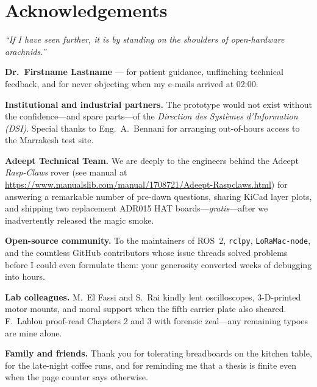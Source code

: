 \chapter*{Acknowledgements}

\begin{flushright}
\textit{“If I have seen further, it is by standing on the shoulders of
open-hardware arachnids.”} %
\end{flushright}

\vspace{1em}

\textbf{Dr.\ Firstname Lastname} — for patient guidance, unflinching
technical feedback, and for never objecting when my e-mails arrived at
02:00.

\medskip
\textbf{Institutional and industrial partners.}
The prototype would not exist without the confidence—and spare
parts—of the \emph{Direction des Systèmes d’Information (DSI)}.
Special thanks to Eng.\ A.~Bennani for arranging out-of-hours access to
the Marrakesh test site.

\medskip
\textbf{Adeept Technical Team.}
We are deeply  to the engineers behind the Adeept
\emph{Rasp-Claws} rover (see manual at
\url{https://www.manualslib.com/manual/1708721/Adeept-Raspclaws.html})
for answering a remarkable number of pre-dawn questions, sharing KiCad
layer plots, and shipping two replacement ADR015 HAT boards—\emph{gratis}—after we inadvertently released the magic smoke.

\medskip
\textbf{Open-source community.}
To the maintainers of ROS~2, \texttt{rclpy}, \texttt{LoRaMac-node}, and
the countless GitHub contributors whose issue threads solved problems
before I could even formulate them: your generosity converted weeks of
debugging into hours.

\medskip
\textbf{Lab colleagues.}
M.~El Fassi and S.~Rai kindly lent oscilloscopes, 3-D-printed motor
mounts, and moral support when the fifth carrier plate also sheared.
F.~Lahlou proof-read Chapters 2 and 3 with forensic zeal—any remaining
typoes are mine alone.

\medskip
\textbf{Family and friends.}
Thank you for tolerating breadboards on the kitchen table, for the
late-night coffee runs, and for reminding me that a thesis is finite
even when the page counter says otherwise.